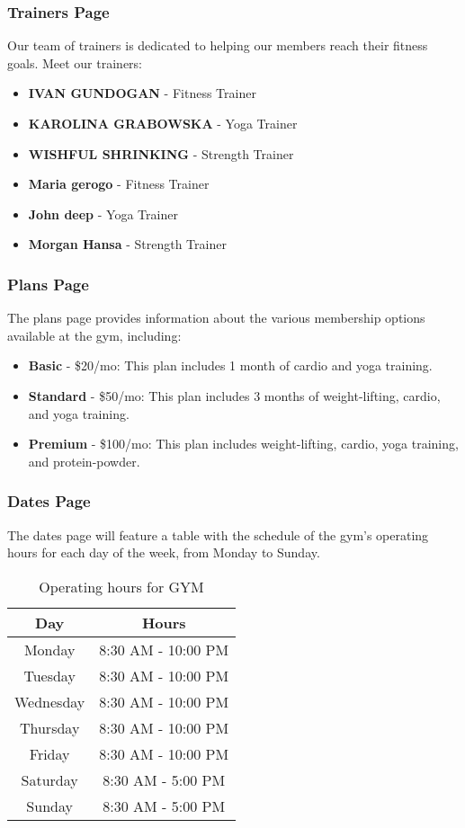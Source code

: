 \documentclass{beamer}
\begin{document}
\begin{frame}
\frametitle{Trainers Page}

Our team of trainers is dedicated to helping our members reach their fitness goals. Meet our trainers:

\begin{itemize}
\item \textbf{IVAN GUNDOGAN} - Fitness Trainer
\item \textbf{KAROLINA GRABOWSKA} - Yoga Trainer
\item \textbf{WISHFUL SHRINKING} - Strength Trainer
\item \textbf{Maria gerogo} - Fitness Trainer
\item \textbf{John deep} - Yoga Trainer
\item \textbf{Morgan Hansa} - Strength Trainer
\end{itemize}
\end{frame}

\begin{frame}
\frametitle{Plans Page}

The plans page provides information about the various membership options available at the gym, including:

\begin{itemize}
\item \textbf{Basic} - \$20/mo: This plan includes 1 month of cardio and yoga training.
\item \textbf{Standard} - \$50/mo: This plan includes 3 months of weight-lifting, cardio, and yoga training.
\item \textbf{Premium} - \$100/mo: This plan includes weight-lifting, cardio, yoga training, and protein-powder.
\end{itemize}
\end{frame}

\begin{frame}
\frametitle{Dates Page}

The dates page will feature a table with the schedule of the gym's operating hours for each day of the week, from Monday to Sunday.

\begin{table}[h]
\begin{tabular}{|c|c|}
\hline
\textbf{Day} & \textbf{Hours} \\ \hline
Monday & 8:30 AM - 10:00 PM \\ \hline
Tuesday & 8:30 AM - 10:00 PM \\ \hline
Wednesday & 8:30 AM - 10:00 PM \\ \hline
Thursday & 8:30 AM - 10:00 PM \\ \hline
Friday & 8:30 AM - 10:00 PM \\ \hline
Saturday & 8:30 AM - 5:00 PM \\ \hline
Sunday & 8:30 AM - 5:00 PM \\ \hline
\end{tabular}
\caption{Operating hours for GYM}
\end{table}
\end{frame}
\end{document}
